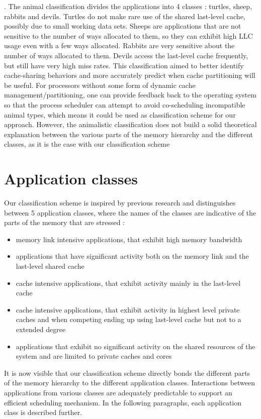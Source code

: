 \documentclass[diploma]{Styles/softlab-thesis}
\begin{document}
. The animal classification divides the applications into 4 classes : turtles, sheep, rabbits and devils. Turtles do not make rare use of the shared last-level cache, possibly due to small working data sets. Sheeps are applications that are not sensitive to the number of ways allocated to them, so they can exhibit high LLC usage even with a few ways allocated. Rabbits are very sensitive about the number of ways allocated to them. Devils access the last-level cache frequently, but still have very high miss rates. This classification aimed to better identify cache-sharing behaviors and more accurately predict when cache partitioning will be useful. For processors without some form of dynamic cache management/partitioning, one can provide feedback back to the operating system so that the process scheduler can attempt to avoid co-scheduling incompatible animal types, which means it could be used as classification scheme for our approach. However, the animalistic classification does not build a solid theoretical explanation between the various parts of the memory hierarchy and the different classes, as it is the case with our classification scheme

\section{Application classes}

Our classification scheme is inspired by previous research \cite{reference1} and distinguishes between 5 application classes, where the names of the classes are indicative of the parts of the memory that are stressed : 
\begin{itemize}
    \item memory link intensive applications, that exhibit high memory bandwidth
    \item applications that have significant activity both on the memory link and the last-level shared cache
    \item cache intensive applications, that exhibit activity mainly in the last-level cache
    \item cache intensive applications, that exhibit activity in highest level private caches and when competing ending up using last-level cache but not to a extended degree
    \item applications that exhibit no significant activity on the shared resources of the system and are limited to private caches and cores
\end{itemize}
It is now visible that our classification scheme directly bonds the different parts of the memory hierarchy to the different application classes. Interactions between applications from various classes are adequately predictable to support an efficient scheduling mechanism. In the following paragraphs, each application class is described further. \\
\end{document}

